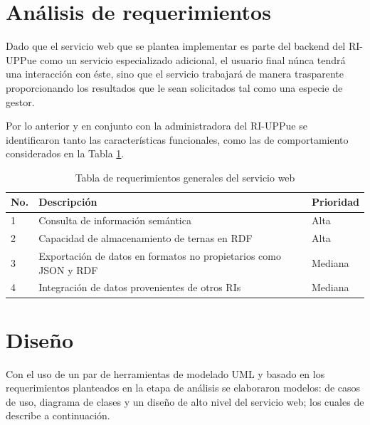\section{An\'alisis de requerimientos}

Dado que el servicio web que se plantea implementar es parte del backend del RI-UPPue como un servicio especializado adicional, el usuario final n\'unca tendr\'a una interacci\'on con \'este, sino que el servicio trabajar\'a de manera trasparente proporcionando los resultados que le sean solicitados tal como una especie de gestor.\newline

Por lo anterior y en conjunto con la administradora del RI-UPPue se identificaron tanto las caracter\'isticas funcionales, como las de comportamiento considerados en la Tabla \ref{tablaRequerimientos}. \newline

\begin{table}[htbp]
    \begin{center}
    \caption{Tabla de requerimientos generales del servicio web}
    \begin{tabular}{| p{1.5cm}| p{8cm} |p{2cm} |}
    \hline
    \centering \textbf{No. } & \textbf{Descripci\'on} & \textbf{Prioridad} \\
    \hline \hline
    1 & Consulta de informaci\'on sem\'antica & Alta  \\ \hline
    2 & Capacidad de almacenamiento de ternas en RDF & Alta  \\ \hline
    3 & Exportaci\'on de datos en formatos no propietarios como JSON y RDF & Mediana  \\ \hline
    4 & Integraci\'on de datos provenientes de otros RIs & Mediana  \\ \hline
    \end{tabular}
    \label{tablaRequerimientos}
    \end{center}
\end{table}

\section{Dise\~{n}o}

Con el uso de un par de herramientas de modelado UML y basado en los requerimientos planteados en la etapa de an\'alisis se elaboraron modelos: de casos de uso, diagrama de clases y un dise\~{n}o de alto nivel del servicio web; los cuales de describe a continuaci\'on.

